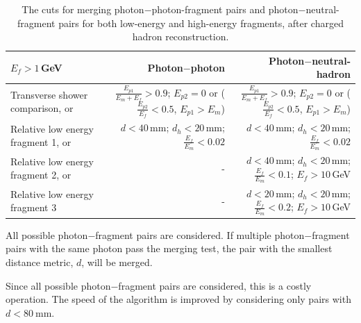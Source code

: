 \begin{table}[htbp]
\begin{tabular}{l  r  r }
\hline
$E_f>1$\,GeV &  Photon$-$photon & Photon$-$neutral-hadron \\
\hline
\multicolumn{1}{L{0.3\textwidth}}{Transverse shower comparison, or} & \multicolumn{1}{R{0.3\textwidth}}{$\frac{E_{p1}}{E_m + E_f} > 0.9 $; $E_{p2} = 0$ or ($\frac{E_{p2}}{E_f} < 0.5 $, $E_{p1} > E_m$)}  & \multicolumn{1}{R{0.3\textwidth}}{$\frac{E_{p1}}{E_m + E_f} > 0.9 $; $E_{p2} = 0$ or ($\frac{E_{p2}}{E_f} < 0.5 $, $E_{p1} > E_m$)} \\
\multicolumn{1}{L{0.3\textwidth}}{Relative low energy fragment 1, or} & \multicolumn{1}{R{0.3\textwidth}}{$d < 40$\,mm; $d_h < 20$\,mm; $\frac{E_f}{E_m} < 0.02$} & \multicolumn{1}{R{0.3\textwidth}}{$d < 40$\,mm; $d_h < 20$\,mm; $\frac{E_f}{E_m} < 0.02$} \\
\multicolumn{1}{L{0.3\textwidth}}{Relative low energy fragment 2, or} & \multicolumn{1}{R{0.3\textwidth}}{-}  & \multicolumn{1}{R{0.3\textwidth}}{$d < 40$\,mm; $d_h < 20$\,mm; $\frac{E_f}{E_m} < 0.1$; $E_f > 10$\,GeV} \\
\multicolumn{1}{L{0.3\textwidth}}{Relative low energy fragment 3} & \multicolumn{1}{R{0.3\textwidth}}{-}  & \multicolumn{1}{R{0.3\textwidth}}{$d < 20$\,mm; $d_h < 20$\,mm; $\frac{E_f}{E_m} < 0.2$; $E_f > 10$\,GeV} \\
\hline
\hline
\end{tabular}

\caption[The cuts for photon fragment removal algorithm in the \ECAL.]%
{The cuts for merging photon$-$photon-fragment pairs and photon$-$neutral-fragment pairs for both low-energy and high-energy fragments, after charged hadron reconstruction.}
\label{tab:photonFragRemovalCuts}
\end{table}


All possible  photon$-$fragment pairs are considered. If multiple photon$-$fragment pairs with the same photon pass the merging test, the pair with the smallest distance metric, $d$, will be merged.

Since all possible photon$-$fragment pairs are considered, this is a costly operation. The speed of the algorithm is improved by considering only pairs with $d<80\ \text{mm}$.






